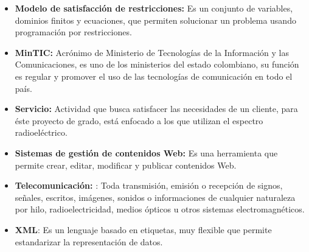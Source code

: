 \begin{itemize}
\item \textbf{Modelo de satisfacción  de restricciones:} \cite{GCP} Es un conjunto de variables, dominios finitos y ecuaciones, que permiten solucionar un problema usando programación por restricciones.

\item \textbf{MinTIC:} \cite{MinTIC} Acrónimo de Ministerio de Tecnologías de la Información y las Comunicaciones, es uno de los ministerios del estado colombiano, su función es regular y promover el uso de las tecnologías de comunicación en todo el país.

\item \textbf{Servicio:} Actividad que busca satisfacer las necesidades de un cliente, para éste proyecto de grado, está enfocado a los que utilizan el espectro radioeléctrico.

\item \textbf{Sistemas de gestión de contenidos Web:} \cite{Gestor} Es una herramienta que permite crear, editar, modificar y publicar contenidos Web.

\item \textbf{Telecomunicación:} \cite{Cuadro}: Toda transmisión, emisión o recepción de signos, señales, escritos, imágenes, sonidos o informaciones de cualquier naturaleza por hilo, radioelectricidad, medios ópticos u otros sistemas electromagnéticos.

\item \textbf{XML}: \cite{XML} Es un lenguaje basado en etiquetas, muy flexible que permite estandarizar la representación de datos.

\end{itemize}
